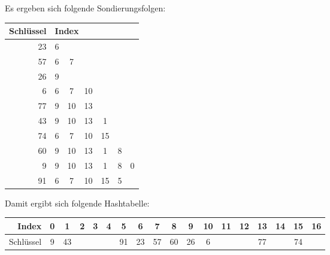 \documentclass{lehramt-informatik-aufgabe}
\begin{document}
\begin{enumerate}
\begin{enumerate}
\begin{antwort}
\bigskip

Es ergeben sich folgende Sondierungsfolgen:

{
\setlength{\tabcolsep}{2pt}
\footnotesize

\begin{tabular}{r|cccccc}
Schlüssel & \multicolumn{6}{l}{Index}\\\hline
23 & 6\\
57 & 6 & 7\\
26 & 9\\
6  & 6 & 7 & 10 \\
77 & 9 & 10 & 13 \\
43 & 9 & 10 & 13 & 1 \\
74 & 6 & 7 & 10 & 15\\
60 & 9 & 10 & 13 & 1 & 8 \\
9  & 9 & 10 & 13 & 1 & 8 & 0\\
91 & 6 & 7 & 10 & 15 & 5\\
\end{tabular}

Damit ergibt sich folgende Hashtabelle:

\begin{tabular}{r|ccccccccccccccccc}
Index & 0 & 1 & 2 & 3 & 4 & 5 & 6 & 7 & 8 & 9 & 10 & 11 & 12 & 13 & 14 & 15 & 16 \\\hline
Schlüssel &9&43&&&&91&23&57&60&26&6&&&77&&74&\\
\end{tabular}
}
\end{antwort}
\end{enumerate}
\end{enumerate}
\end{document}

